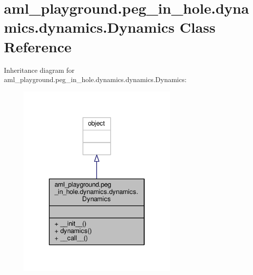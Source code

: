 \hypertarget{classaml__playground_1_1peg__in__hole_1_1dynamics_1_1dynamics_1_1_dynamics}{\section{aml\-\_\-playground.\-peg\-\_\-in\-\_\-hole.\-dynamics.\-dynamics.\-Dynamics Class Reference}
\label{classaml__playground_1_1peg__in__hole_1_1dynamics_1_1dynamics_1_1_dynamics}
}


Inheritance diagram for aml\-\_\-playground.\-peg\-\_\-in\-\_\-hole.\-dynamics.\-dynamics.\-Dynamics\-:\nopagebreak
\begin{figure}[H]
\begin{center}
\leavevmode
\includegraphics[width=226pt]{classaml__playground_1_1peg__in__hole_1_1dynamics_1_1dynamics_1_1_dynamics__inherit__graph}
\end{center}
\end{figure}


